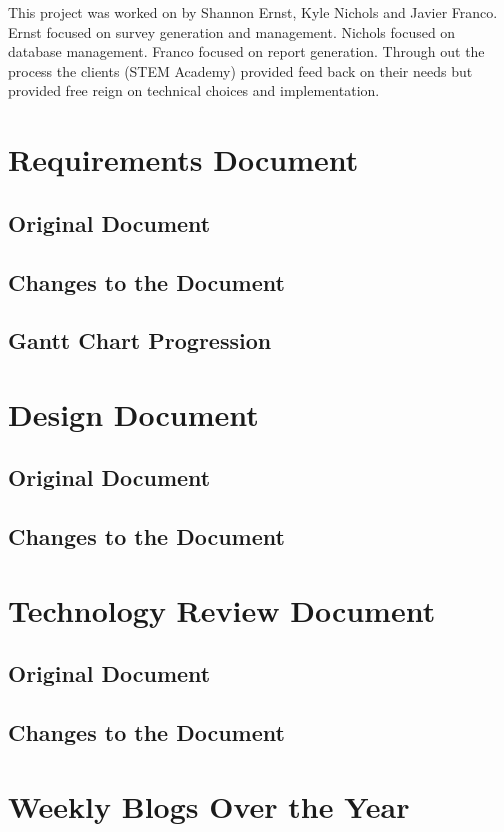 \documentclass[letterpaper,10pt,serif,draftclsnofoot,onecolumn,compsoc,titlepage]{IEEEtran}
\begin{document}
This project was worked on by Shannon Ernst, Kyle Nichols and Javier Franco. Ernst focused on survey generation and management. 
Nichols focused on database management. Franco focused on report generation. Through out the process the clients (STEM Academy) provided 
feed back on their needs but provided free reign on technical choices and implementation. 
\section{Requirements Document}
\subsection{Original Document}
%
%
\subsection{Changes to the Document}
\subsection{Gantt Chart Progression}
\section{Design Document}
\subsection{Original Document}
\subsection{Changes to the Document}
\section{Technology Review Document}
\subsection{Original Document}
\subsection{Changes to the Document}
\section{Weekly Blogs Over the Year}



\end{document}

